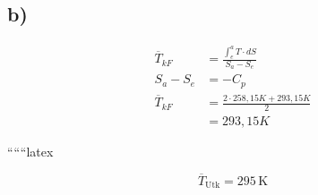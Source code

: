 

\subsection*{b)}

\begin{align*}
\overline{T}_{kF} &= \frac{\int_{e}^{a} T \cdot dS}{S_a - S_e} \\
S_a - S_e &= -C_p \\
\overline{T}_{kF} &= \frac{2 \cdot 258,15 K + 293,15 K}{2} \\
&= 293,15 K
\end{align*}

``````latex

\[
\overline{T}_{\text{Utk}} = 295 \, \text{K}
\]